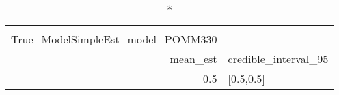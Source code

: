 \begin{longtable}{rl}
\caption*{
{\large alphasummarytable} \\ 
{\small True\_ModelSimpleEst\_model\_POMM330}
} \\ 
\toprule
mean\_est & credible\_interval\_95 \\ 
\midrule
0.5 & [0.5,0.5] \\ 
\bottomrule
\end{longtable}

